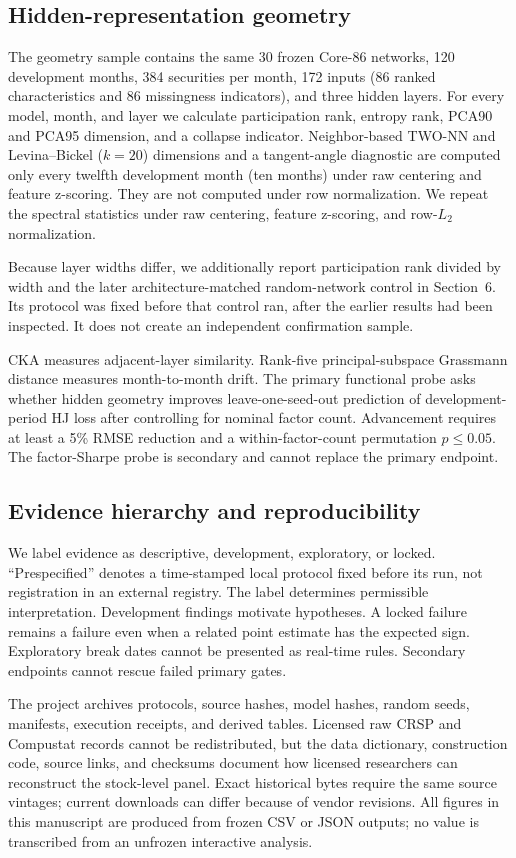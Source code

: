 \subsection{Hidden-representation geometry}

The geometry sample contains the same 30 frozen Core-86 networks, 120 development months, 384 securities per month, 172 inputs (86 ranked characteristics and 86 missingness indicators), and three hidden layers. For every model, month, and layer we calculate participation rank, entropy rank, PCA90 and PCA95 dimension, and a collapse indicator. Neighbor-based TWO-NN and Levina--Bickel ($k=20$) dimensions and a tangent-angle diagnostic are computed only every twelfth development month (ten months) under raw centering and feature z-scoring. They are not computed under row normalization. We repeat the spectral statistics under raw centering, feature z-scoring, and row-$L_2$ normalization.

Because layer widths differ, we additionally report participation rank divided by width and the later architecture-matched random-network control in Section~6. Its protocol was fixed before that control ran, after the earlier results had been inspected. It does not create an independent confirmation sample.

CKA measures adjacent-layer similarity. Rank-five principal-subspace Grassmann distance measures month-to-month drift. The primary functional probe asks whether hidden geometry improves leave-one-seed-out prediction of development-period HJ loss after controlling for nominal factor count. Advancement requires at least a 5\% RMSE reduction and a within-factor-count permutation $p\leq0.05$. The factor-Sharpe probe is secondary and cannot replace the primary endpoint.

\subsection{Evidence hierarchy and reproducibility}

We label evidence as descriptive, development, exploratory, or locked. ``Prespecified'' denotes a time-stamped local protocol fixed before its run, not registration in an external registry. The label determines permissible interpretation. Development findings motivate hypotheses. A locked failure remains a failure even when a related point estimate has the expected sign. Exploratory break dates cannot be presented as real-time rules. Secondary endpoints cannot rescue failed primary gates.

The project archives protocols, source hashes, model hashes, random seeds, manifests, execution receipts, and derived tables. Licensed raw CRSP and Compustat records cannot be redistributed, but the data dictionary, construction code, source links, and checksums document how licensed researchers can reconstruct the stock-level panel. Exact historical bytes require the same source vintages; current downloads can differ because of vendor revisions. All figures in this manuscript are produced from frozen CSV or JSON outputs; no value is transcribed from an unfrozen interactive analysis.
